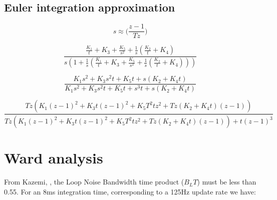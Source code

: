 \subsection{Euler integration approximation}

\begin{equation}
s \approx \Big(\frac{z-1}{Tz}\Big)
\end{equation}

\begin{comment}
\begin{equation}
 H(s) = \frac{s^2(K1) + s(K2) + K3}
 {s^3+ s^2(K1)+ s(K2) + K3}
\end{equation}

\begin{equation}
 H(s) = \frac{\Big(\frac{z-1}{Tz}\Big)^2(K1) + \Big(\frac{z-1}{Tz}\Big)(K2) + K3}{\Big(\frac{z-1}{Tz}\Big)^3+ \Big(\frac{z-1}{Tz}\Big)^2(K1)+ \Big(\frac{z-1}{Tz}\Big)(K2) + K3}
\end{equation}
\end{comment}

\begin{equation}
\frac{\frac{K_{1}}{t} + K_{3} + \frac{K_{5}}{s^{2}} + \frac{1}{s} \left(\frac{K_{2}}{t} + K_{4}\right)}{s \left(1 + \frac{1}{s} \left(\frac{K_{1}}{t} + K_{3} + \frac{K_{5}}{s^{2}} + \frac{1}{s} \left(\frac{K_{2}}{t} + K_{4}\right)\right)\right)}
\end{equation}

\begin{equation}
\frac{K_{1} s^{2} + K_{3} s^{2} t + K_{5} t + s \left(K_{2} + K_{4} t\right)}{K_{1} s^{2} + K_{3} s^{2} t + K_{5} t + s^{3} t + s \left(K_{2} + K_{4} t\right)}
\end{equation}

\begin{equation}
\frac{T z \left(K_{1} \left(z - 1\right)^{2} + K_{3} t \left(z - 1\right)^{2} + K_{5} T^{2} t z^{2} + T z \left(K_{2} + K_{4} t\right) \left(z - 1\right)\right)}{T z \left(K_{1} \left(z - 1\right)^{2} + K_{3} t \left(z - 1\right)^{2} + K_{5} T^{2} t z^{2} + T z \left(K_{2} + K_{4} t\right) \left(z - 1\right)\right) + t \left(z - 1\right)^{3}}
\end{equation}

\clearpage


\section{Ward analysis}

From Kazemi, \cite{Kazemi2008}, the Loop Noise Bandwidth time product ($B_L T$) must be less than 0.55. 
For an 8ms integration time, corresponding to a 125Hz update rate we have:

